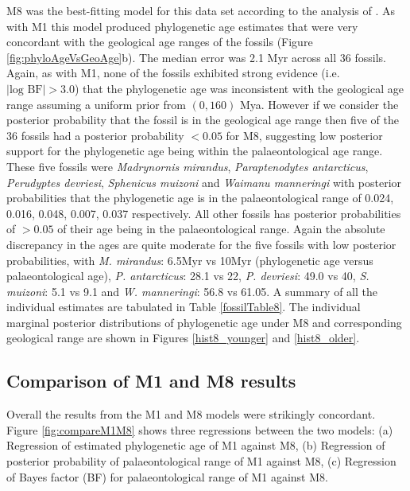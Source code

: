 \documentclass[11pt]{article}
\newcommand{\Mstrict}{{M1}}
\newcommand{\Mrelaxed}{{M8}}
\begin{document}
\Mrelaxed{} was the best-fitting model for this data set according to the analysis of \textcite{gavryushkina2015bayesian}. As with \Mstrict{} this model produced phylogenetic age estimates that were very concordant with the geological age ranges of the fossils (Figure \ref{fig:phyloAgeVsGeoAge}b). The median error was 2.1 Myr across all 36 fossils. Again, as with \Mstrict{}, none of the fossils exhibited strong evidence (i.e. $|\text{log BF}| > 3.0$) that the phylogenetic age was inconsistent with the geological age range assuming a uniform prior from $(0,160)$ Mya. However if we consider the posterior probability that the fossil is in the geological age range then five of the 36 fossils had a posterior probability $< 0.05$ for \Mrelaxed{}, suggesting low posterior support for the phylogenetic age being within the palaeontological age range. These five fossils were {\em Madrynornis mirandus}, {\em Paraptenodytes antarcticus}, {\em Perudyptes devriesi}, {\em Sphenicus muizoni} and {\em Waimanu manneringi} with posterior probabilities that the phylogenetic age is in the palaeontological range of 0.024, 0.016, 0.048, 0.007, 0.037 respectively. All other fossils has posterior probabilities of $> 0.05$ of their age being in the palaeontological range. Again the absolute discrepancy in the ages are quite moderate for the five fossils with low posterior probabilities, with {\em M. mirandus}: 6.5Myr vs 10Myr (phylogenetic age versus palaeontological age), {\em P. antarcticus}: 28.1 vs 22, {\em P. devriesi}: 49.0 vs 40, {\em S. muizoni}: 5.1 vs 9.1 and {\em W. manneringi}: 56.8 vs 61.05. A summary of all the individual estimates are tabulated in Table \ref{fossilTable8}. The individual marginal posterior distributions of phylogenetic age under \Mrelaxed{} and corresponding geological range are shown in Figures \ref{hist8_younger} and \ref{hist8_older}.

\subsection*{Comparison of M1 and M8 results}

Overall the results from the M1 and M8 models were strikingly concordant. Figure \ref{fig:compareM1M8} shows three regressions between the two models: (a) Regression of estimated phylogenetic age of \Mstrict{} against \Mrelaxed{}, (b) Regression of posterior probability of palaeontological range of \Mstrict{} against \Mrelaxed{}, (c) Regression of Bayes factor (BF) for palaeontological range of \Mstrict{} against \Mrelaxed{}.
\end{document}
